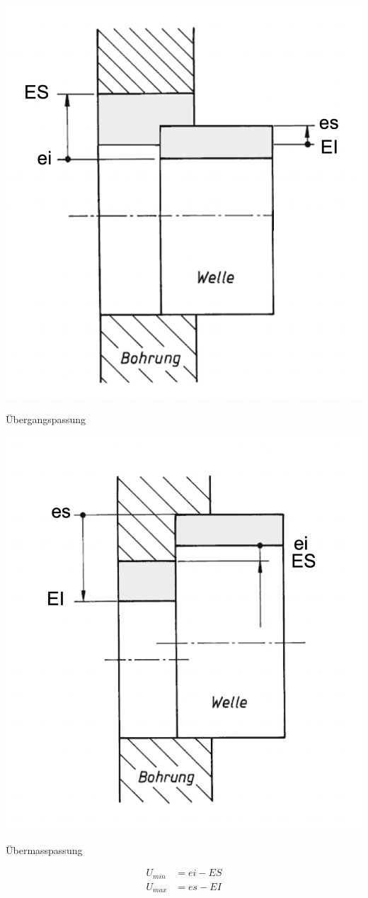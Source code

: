     \begin{minipage}{0.99\linewidth}
        \begin{minipage}{0.49\linewidth}
            \begin{center}
                \includegraphics[width = 0.6\linewidth]{src/images/MAEIP_Uebergangspassung.png}
            \end{center}
        \end{minipage}
        \begin{minipage}{0.49\linewidth}
            Übergangspassung
        \end{minipage}
    \end{minipage}
    \begin{minipage}{0.99\linewidth}
        \begin{minipage}{0.49\linewidth}
            \begin{center}
                \includegraphics[width = 0.6\linewidth]{src/images/MAEIP_Uebermasspassung.png}
            \end{center}
        \end{minipage}
        \begin{minipage}{0.49\linewidth}
            Übermasspassung

            \begin{align*}
                U_{min} &= ei - ES\\
                U_{max} &= es - EI
            \end{align*}
        \end{minipage}
    \end{minipage}
    \cbreak